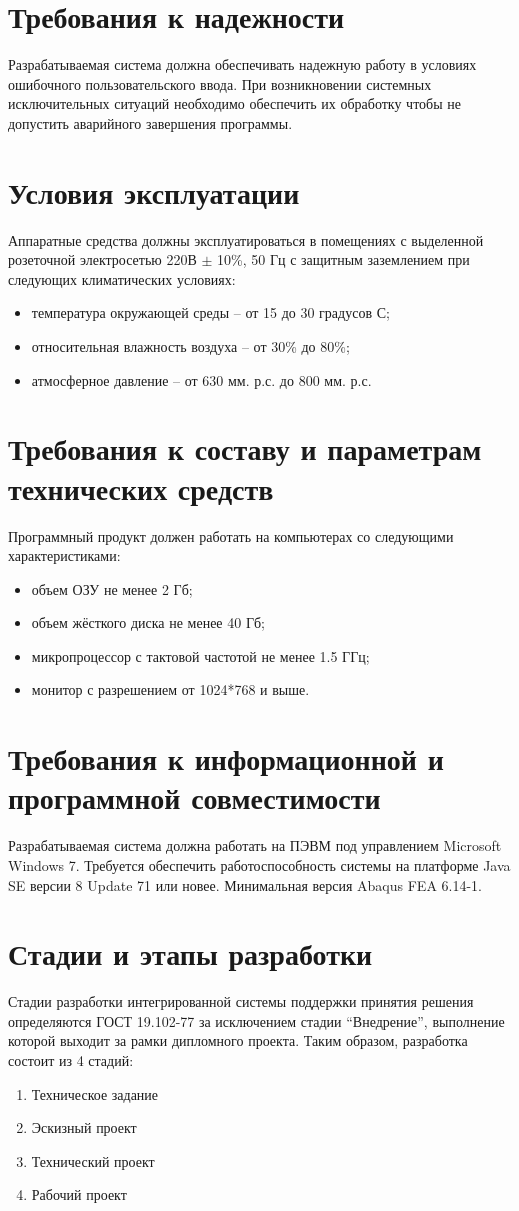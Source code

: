 \documentclass[14pt,oneside,final]{extreport}
\newcommand*\minus{\item[--]} %
\begin{document}
	\section{Требования к надежности}
	Разрабатываемая система должна обеспечивать надежную работу в условиях ошибочного пользовательского ввода. При возникновении системных исключительных ситуаций необходимо обеспечить их обработку чтобы не допустить аварийного завершения программы.

	\section{Условия эксплуатации}
	Аппаратные   средства   должны   эксплуатироваться   в помещениях с выделенной розеточной электросетью 220В \(\pm\) 10\%, 50 Гц  с  защитным  заземлением  при  следующих  климатических условиях:
	\begin{itemize}
	\minus температура окружающей среды – от 15 до 30 градусов С;
	\minus относительная влажность воздуха -- от 30\% до 80\%;
	\minus атмосферное давление -- от 630 мм. р.с. до 800 мм. р.с.
	\end{itemize}

	\section{Требования к составу и параметрам технических средств}
	Программный продукт должен работать на компьютерах со следующими характеристиками:
	\begin{itemize}
		\minus объем ОЗУ не менее 2 Гб;
		\minus объем жёсткого диска не менее 40 Гб;
		\minus микропроцессор с тактовой частотой не менее 1.5 ГГц;
		\minus монитор с разрешением от 1024*768 и выше.
	\end{itemize}

	\section{Требования к информационной и программной совместимости}
	Разрабатываемая система должна работать на ПЭВМ под управлением Microsoft Windows 7. Требуется обеспечить работоспособность системы на платформе Java SE версии 8 Update 71 или новее. Минимальная версия Abaqus FEA 6.14-1.
	
	\section{Стадии и этапы разработки}
	Стадии разработки интегрированной системы поддержки принятия решения определяются ГОСТ 19.102-77 за исключением стадии ``Внедрение'', выполнение которой выходит за рамки дипломного проекта. Таким образом, разработка  состоит из 4 стадий:
	\begin{enumerate}
		\item Техническое задание
		\item Эскизный проект
		\item Технический проект
		\item Рабочий проект
	\end{enumerate}
	
\end{document}
